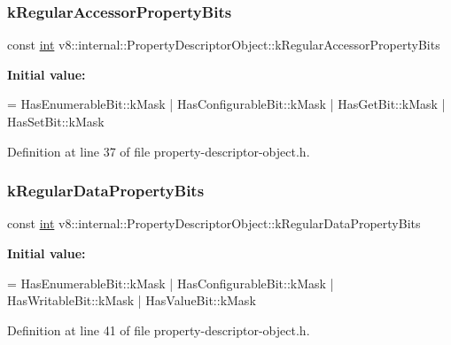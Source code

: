 \subsubsection{\texorpdfstring{k\+Regular\+Accessor\+Property\+Bits}{kRegularAccessorPropertyBits}}
{\footnotesize\ttfamily const \mbox{\hyperlink{classint}{int}} v8\+::internal\+::\+Property\+Descriptor\+Object\+::k\+Regular\+Accessor\+Property\+Bits\hspace{0.3cm}{\ttfamily [static]}}

{\bfseries Initial value\+:}
\begin{DoxyCode}
=
      HasEnumerableBit::kMask | HasConfigurableBit::kMask | HasGetBit::kMask |
      HasSetBit::kMask
\end{DoxyCode}


Definition at line 37 of file property-\/descriptor-\/object.\+h.

\mbox{\label{classv8_1_1internal_1_1PropertyDescriptorObject_a4d5edcc482416aacbc39c5e0966cd409}} 
\subsubsection{\texorpdfstring{k\+Regular\+Data\+Property\+Bits}{kRegularDataPropertyBits}}
{\footnotesize\ttfamily const \mbox{\hyperlink{classint}{int}} v8\+::internal\+::\+Property\+Descriptor\+Object\+::k\+Regular\+Data\+Property\+Bits\hspace{0.3cm}{\ttfamily [static]}}

{\bfseries Initial value\+:}
\begin{DoxyCode}
=
      HasEnumerableBit::kMask | HasConfigurableBit::kMask |
      HasWritableBit::kMask | HasValueBit::kMask
\end{DoxyCode}


Definition at line 41 of file property-\/descriptor-\/object.\+h.

\mbox{\label{classv8_1_1internal_1_1PropertyDescriptorObject_a5a2a2bd927cc1790346ca21bd6ef3159}} 
